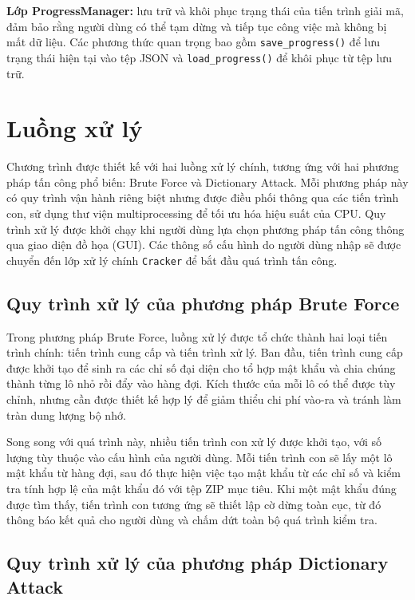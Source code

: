 \documentclass[../DoAn.tex]{subfiles}
\begin{document}
\textbf{Lớp ProgressManager:} lưu trữ và khôi phục trạng thái của tiến trình giải mã, đảm bảo rằng người dùng có thể tạm dừng và tiếp tục công việc mà không bị mất dữ liệu. Các phương thức quan trọng bao gồm \verb|save_progress()| để lưu trạng thái hiện tại vào tệp JSON và \verb|load_progress()| để khôi phục từ tệp lưu trữ.
 

\section{Luồng xử lý}

Chương trình được thiết kế với hai luồng xử lý chính, tương ứng với hai phương pháp tấn công phổ biến: Brute Force và Dictionary Attack. Mỗi phương pháp này có quy trình vận hành riêng biệt nhưng được điều phối thông qua các tiến trình con, sử dụng thư viện multiprocessing để tối ưu hóa hiệu suất của CPU. Quy trình xử lý được khởi chạy khi người dùng lựa chọn phương pháp tấn công thông qua giao diện đồ họa (GUI). Các thông số cấu hình do người dùng nhập sẽ được chuyển đến lớp xử lý chính \verb|Cracker| để bắt đầu quá trình tấn công.

\subsection{Quy trình xử lý của phương pháp Brute Force}
Trong phương pháp Brute Force, luồng xử lý được tổ chức thành hai loại tiến trình chính: tiến trình cung cấp và tiến trình xử lý. Ban đầu, tiến trình cung cấp được khởi tạo để sinh ra các chỉ số đại diện cho tổ hợp mật khẩu và chia chúng thành từng lô nhỏ rồi đẩy vào hàng đợi. Kích thước của mỗi lô có thể được tùy chỉnh, nhưng cần được thiết kế hợp lý để giảm thiểu chi phí vào-ra và tránh làm tràn dung lượng bộ nhớ.

Song song với quá trình này, nhiều tiến trình con xử lý được khởi tạo, với số lượng tùy thuộc vào cấu hình của người dùng. Mỗi tiến trình con sẽ lấy một lô mật khẩu từ hàng đợi, sau đó thực hiện việc tạo mật khẩu từ các chỉ số và kiểm tra tính hợp lệ của mật khẩu đó với tệp ZIP mục tiêu. Khi một mật khẩu đúng được tìm thấy, tiến trình con tương ứng sẽ thiết lập cờ dừng toàn cục, từ đó thông báo kết quả cho người dùng và chấm dứt toàn bộ quá trình kiểm tra.

\subsection{Quy trình xử lý của phương pháp Dictionary Attack}
\end{document}
